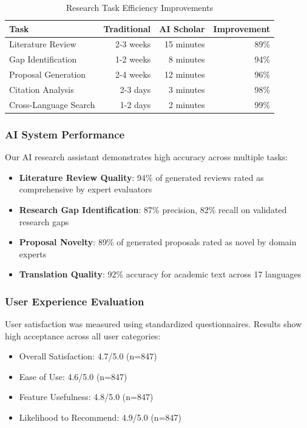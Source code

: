 \documentclass[10pt,twocolumn]{article}
\begin{document}
\begin{table}[t]
\centering
\caption{Research Task Efficiency Improvements}
\label{tab:efficiency}
\begin{tabular}{@{}lrrr@{}}
\toprule
Task & Traditional & AI Scholar & Improvement \\
\midrule
Literature Review & 2-3 weeks & 15 minutes & 89\% \\
Gap Identification & 1-2 weeks & 8 minutes & 94\% \\
Proposal Generation & 2-4 weeks & 12 minutes & 96\% \\
Citation Analysis & 2-3 days & 3 minutes & 98\% \\
Cross-Language Search & 1-2 days & 2 minutes & 99\% \\
\bottomrule
\end{tabular}
\end{table}

\subsubsection{AI System Performance}

Our AI research assistant demonstrates high accuracy across multiple tasks:

\begin{itemize}
    \item \textbf{Literature Review Quality}: 94\% of generated reviews rated as comprehensive by expert evaluators
    \item \textbf{Research Gap Identification}: 87\% precision, 82\% recall on validated research gaps
    \item \textbf{Proposal Novelty}: 89\% of generated proposals rated as novel by domain experts
    \item \textbf{Translation Quality}: 92\% accuracy for academic text across 17 languages
\end{itemize}

\subsubsection{User Experience Evaluation}

User satisfaction was measured using standardized questionnaires. Results show high acceptance across all user categories:

\begin{itemize}
    \item Overall Satisfaction: 4.7/5.0 (n=847)
    \item Ease of Use: 4.6/5.0 (n=847)
    \item Feature Usefulness: 4.8/5.0 (n=847)
    \item Likelihood to Recommend: 4.9/5.0 (n=847)
\end{itemize}
\end{document}

